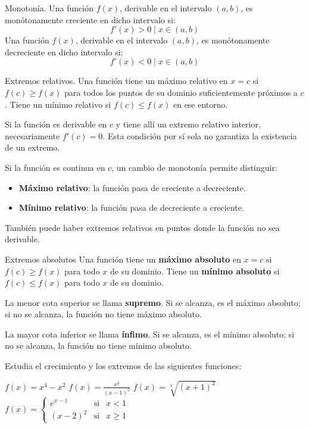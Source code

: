 \begin{definicion}{Monotonía.}
Una función $f(x)$, derivable en el intervalo $(a,b)$, es monótonamente creciente en dicho intervalo si: 
    $$f'(x)>0\mid x\in(a,b)$$
Una función $f(x)$, derivable en el intervalo $(a,b)$, es monótonamente decreciente en dicho intervalo si: 
    $$f'(x)<0\mid x\in(a,b)$$
\end{definicion}

\begin{definicion}{Extremos relativos.}
Una función tiene un máximo relativo en $x=c$ si $f(c)\geqslant f(x)$ para todos los puntos de su dominio suficientemente próximos a $c$. Tiene un mínimo relativo si $f(c)\leqslant f(x)$ en ese entorno.

Si la función es derivable en $c$ y tiene allí un extremo relativo interior, necesariamente $f'(c)=0$. Esta condición por sí sola no garantiza la existencia de un extremo.

Si la función es continua en $c$, un cambio de monotonía permite distinguir:
\begin{itemize}
    \item \textbf{Máximo relativo}: la función pasa de creciente a decreciente.
    \item \textbf{Mínimo relativo}: la función pasa de decreciente a creciente.
\end{itemize}
También puede haber extremos relativos en puntos donde la función no sea derivable.
\end{definicion}

\begin{definicion}{Extremos absolutos}
Una función tiene un \textbf{máximo absoluto} en $x=c$ si $f(c)\geqslant f(x)$ para todo $x$ de su dominio. Tiene un \textbf{mínimo absoluto} si $f(c)\leqslant f(x)$ para todo $x$ de su dominio.

La menor cota superior se llama \textbf{supremo}. Si se alcanza, es el máximo absoluto; si no se alcanza, la función no tiene máximo absoluto.

La mayor cota inferior se llama \textbf{ínfimo}. Si se alcanza, es el mínimo absoluto; si no se alcanza, la función no tiene mínimo absoluto.
\end{definicion}

\begin{ejemplo}{
Estudia el crecimiento y los extremos de las siguientes funciones:
\begin{apartados}
 \ap $\displaystyle{f(x)=x^4-x^2}$
 \ap $\displaystyle{f(x)=\frac{x^3}{(x-1)^2}}$
 \ap $\displaystyle{f(x)=\sqrt[3]{(x+1)^2}}$
 \ap $\displaystyle{f(x)=\left\{\begin{array}{lcc}
        e^{x-1}&\text{si}&x<1\\
        (x-2)^2&\text{si}&x\geqslant1
    \end{array}\right.}$
\end{apartados}
}
\end{ejemplo}

